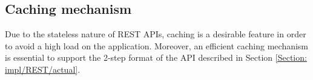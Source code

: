 	\subsection{Caching mechanism} \label{Section: impl/REST/caching}
	Due to the stateless nature of REST APIs, caching is a desirable feature in order to avoid a high load on the application. Moreover, an efficient caching mechanism is essential to support the 2-step format of the API described in Section \ref{Section: impl/REST/actual}. 
	
	\section{}
